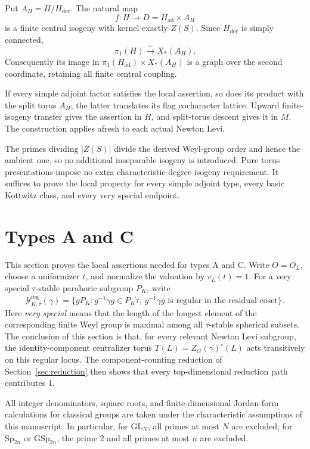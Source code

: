 \documentclass[11pt,a4paper]{article}
\theoremstyle{definition}
\theoremstyle{remark}
\begin{document}
Put \(A_H=H/H_{\mathrm{der}}\). The natural map
\[
f:H\longrightarrow D=H_{\mathrm{ad}}\times A_H
\]
is a finite central isogeny with kernel exactly \(Z(S)\).
Since \(H_{\mathrm{der}}\) is simply connected,
\[
\pi_1(H)\overset\sim\longrightarrow X_*(A_H).
\]
Consequently its image in
\(\pi_1(H_{\mathrm{ad}})\times X_*(A_H)\) is a graph over the second
coordinate, retaining all finite central coupling.

If every simple adjoint factor satisfies the local assertion, so
does its product with the split torus \(A_H\); the latter translates
its flag cocharacter lattice. Upward finite-isogeny transfer gives
the assertion in \(H\), and split-torus descent gives it in \(M\).
The construction applies afresh to each actual Newton Levi.

The primes dividing \(|Z(S)|\) divide the derived Weyl-group order
and hence the ambient one, so no additional inseparable isogeny is
introduced. Pure torus presentations impose no extra
characteristic-degree isogeny requirement. It suffices to prove the
local property for every simple adjoint type, every basic Kottwitz
class, and every very special endpoint.

\section{Types A and C}\label{sec:ac}

This section proves the local assertions needed for types A and C. Write
\(O=O_L\), choose a uniformizer \(t\), and normalize the valuation by
\(v_L(t)=1\). For a very special \(\tau\)-stable parahoric subgroup \(P_K\),
write
\[
\mathscr Y^{\mathrm{reg}}_{K,\tau}(\gamma)
=\{gP_K:g^{-1}\gamma g\in P_K\dot\tau,\ 
\overline{g^{-1}\gamma g}\text{ is regular in the residual coset}\}.
\]
Here \emph{very special} means that the length of the longest element of the
corresponding finite Weyl group is maximal among all \(\tau\)-stable
spherical subsets. The conclusion of this section is that, for every
relevant Newton Levi subgroup, the identity-component centralizer torus
\(T(L)=Z_G(\gamma)^\circ(L)\) acts transitively on this regular locus. The
component-counting reduction of Section~\ref{sec:reduction} then shows that
every top-dimensional reduction path contributes \(1\).

All integer denominators, square roots, and finite-dimensional Jordan-form
calculations for classical groups are taken under the characteristic
assumptions of this manuscript. In particular, for \(\mathrm{GL}_N\), all
primes at most \(N\) are excluded; for \(\mathrm{Sp}_{2n}\) or
\(\mathrm{GSp}_{2n}\), the prime \(2\) and all primes at most \(n\) are
excluded.
\end{document}
